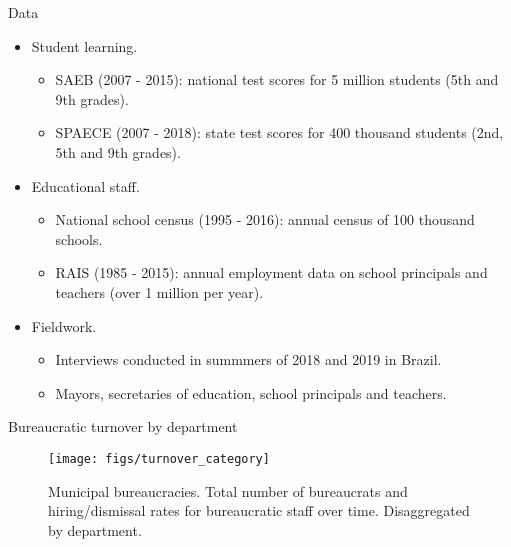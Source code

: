 \documentclass[ignorenonframetext,]{beamer}
\providecommand{\tightlist}{%
  \setlength{\itemsep}{0pt}\setlength{\parskip}{0pt}}
\begin{document}
\begin{frame}{Data}
\protect\hypertarget{data}{}

\begin{itemize}
\tightlist
\item
  Student learning.

  \begin{itemize}
  \tightlist
  \item
    SAEB (2007 - 2015): national test scores for 5 million students (5th
    and 9th grades).
  \item
    SPAECE (2007 - 2018): state test scores for 400 thousand students
    (2nd, 5th and 9th grades).
  \end{itemize}
\item
  Educational staff.

  \begin{itemize}
  \tightlist
  \item
    National school census (1995 - 2016): annual census of 100 thousand
    schools.
  \item
    RAIS (1985 - 2015): annual employment data on school principals and
    teachers (over 1 million per year).
  \end{itemize}
\item
  Fieldwork.

  \begin{itemize}
  \tightlist
  \item
    Interviews conducted in summmers of 2018 and 2019 in Brazil.
  \item
    Mayors, secretaries of education, school principals and teachers.
  \end{itemize}
\end{itemize}

\end{frame}

\begin{frame}{Bureaucratic turnover by department}
\protect\hypertarget{bureaucratic-turnover-by-department}{}

\begin{figure}

{\centering \texttt{[image: figs/turnover\_category]} 

}

\caption{Municipal bureaucracies. Total number of bureaucrats and hiring/dismissal rates for bureaucratic staff over time. Disaggregated by department.}\label{fig:staff}
\end{figure}

\end{frame}
\end{document}

